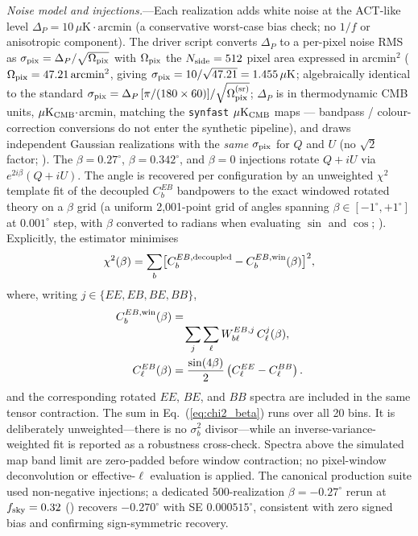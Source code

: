 \documentclass[aps,prd,twocolumn,superscriptaddress,showpacs,preprintnumbers,nofootinbib,longbibliography,floatfix]{revtex4-2}
\begin{document}
\emph{Noise model and injections.}---Each realization adds white noise at
the ACT-like level $\Delta_P=10\,\mu\text{K}\cdot\text{arcmin}$ (a
conservative worst-case bias check; no $1/f$ or anisotropic component).
The driver script converts $\Delta_P$ to a per-pixel noise RMS as
$\sigma_{\rm pix} = \Delta_P/\sqrt{\Omega_{\rm pix}}$ with
$\Omega_{\rm pix}$ the $N_{\rm side}=512$ pixel area expressed in
arcmin$^2$ ($\Omega_{\rm pix} = 47.21\,\text{arcmin}^2$, giving
$\sigma_{\rm pix} = 10/\sqrt{47.21} = 1.455\,\mu\text{K}$; algebraically
identical to the standard
$\sigma_{\rm pix}=\Delta_P\,[\pi/(180\times 60)]/\sqrt{\Omega_{\rm pix}^{\rm (sr)}}$;
$\Delta_P$ is in thermodynamic CMB units, $\mu\text{K}_{\rm CMB}\cdot$arcmin,
matching the \texttt{synfast} $\mu\text{K}_{\rm CMB}$ maps --- bandpass /
colour-correction conversions do not enter the synthetic pipeline),
and draws independent Gaussian realizations with the \emph{same}
$\sigma_{\rm pix}$ for $Q$ and $U$ (no $\sqrt{2}$ factor;
).
The $\beta=0.27^\circ$,
$\beta=0.342^\circ$, and $\beta=0$ injections rotate $Q+iU$ via
$e^{2i\beta}(Q+iU)$. The angle is recovered per configuration by an
unweighted $\chi^2$ template fit of the decoupled $C_b^{EB}$ bandpowers
to the exact windowed rotated theory on a $\beta$ grid
(a uniform 2{,}001-point grid of angles spanning $\beta\in[-1^\circ,+1^\circ]$ at $0.001^\circ$ step,
with $\beta$ converted to radians when evaluating $\sin$ and $\cos$;
).
Explicitly, the estimator minimises
\begin{equation}\label{eq:chi2_beta}
\chi^2(\beta) = \sum_b
\bigl[C_b^{EB,\rm decoupled} - C_b^{EB,\rm win}(\beta)\bigr]^2,
\end{equation}
where, writing $j\in\{EE,EB,BE,BB\}$,
\begin{align}
C_b^{EB,\rm win}(\beta) &={}\nonumber\\[-0.6ex]
  &\quad\sum_j\sum_\ell W_{b\ell}^{EB,j}\,C_\ell^j(\beta),\\
C_\ell^{EB}(\beta)
  &=\frac{\sin(4\beta)}{2}
    \left(C_\ell^{EE}-C_\ell^{BB}\right).
\end{align}
and the corresponding rotated $EE$, $BE$, and $BB$ spectra are included in
the same tensor contraction. The sum in Eq.~(\ref{eq:chi2_beta}) runs over
all 20 bins. It is deliberately unweighted---there is no $\sigma_b^2$
divisor---while an inverse-variance-weighted fit is reported as a robustness
cross-check. Spectra above the simulated map band limit are zero-padded
before window contraction; no pixel-window deconvolution or effective-$\ell$
evaluation is applied.
The canonical production suite used non-negative injections; a dedicated 500-realization
$\beta=-0.27^\circ$ rerun at $f_{\rm sky}=0.32$
()
recovers $-0.270^\circ$ with SE $0.000515^\circ$, consistent with zero
signed bias and confirming sign-symmetric recovery.
\end{document}

